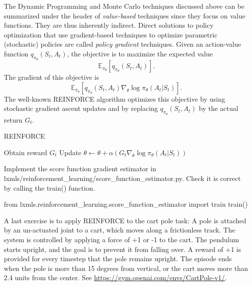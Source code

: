 The Dynamic Programming and Monte Carlo techniques discussed above can be summarized under the header of \emph{value-based} techniques since they focus on value functions. They are thus inherently indirect. Direct solutions to policy optimization that use gradient-based techniques to optimize parametric (stochastic) policies are called \emph{policy gradient} techniques. Given an action-value function $q_{\pi_\theta}(S_t,A_t)$, the objective is to maximize the expected value  \[\mathbb{E}_{\pi_{\theta}}[q_{\pi_\theta}(S_t,A_t)].\]
The gradient of this objective is  
\[\mathbb{E}_{\pi_{\theta}}[q_{\pi_\theta}(S_t,A_t) \nabla_{\theta} \log \pi_{\theta}(A_t|S_t)].\]
The well-known REINFORCE algorithm optimizes this objective by using stochastic gradient ascent updates and by replacing $q_{\pi_\theta}(S_t,A_t)$ by the actual return $G_t$.

\begin{algorithm}[h!]
\label{algo:reinforce}
   \caption{REINFORCE}
\begin{algorithmic}[1]
\STATE Obtain reward $G_t$%
\STATE Update $\theta \leftarrow \theta + \alpha (
G_t
\nabla_{\theta} \log \pi_{\theta}(A_t|S_t))$
\ENDFOR
	\ENDFOR
\end{algorithmic}
\end{algorithm}



\begin{exercise}
Implement the score function gradient estimator in lxmls/reinforcement\_learning/score\_function\_estimator.py. Check it is correct by calling the train() function.
\begin{python}
from lxmls.reinforcement_learning.score_function_estimator import train
train()
\end{python}
\end{exercise}

A last exercise is to apply REINFORCE to the cart pole task: A pole is attached by an un-actuated joint to a cart, which moves along a frictionless track. The system is controlled by applying a force of +1 or -1 to the cart. The pendulum starts upright, and the goal is to prevent it from falling over. A reward of +1 is provided for every timestep that the pole remains upright. The episode ends when the pole is more than 15 degrees from vertical, or the cart moves more than 2.4 units from the center. See \url{ https://gym.openai.com/envs/CartPole-v1/}.


